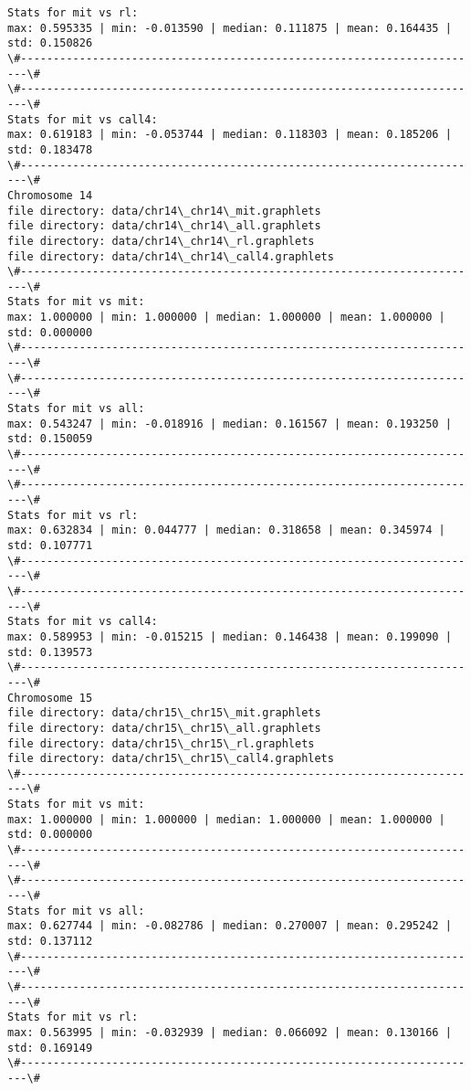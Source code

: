 \documentclass[11pt]{article}
\begin{document}
\begin{Verbatim}[commandchars=\\\{\}]
Stats for mit vs rl: 
max: 0.595335 | min: -0.013590 | median: 0.111875 | mean: 0.164435 | std: 0.150826
\#-----------------------------------------------------------------------\#
\#-----------------------------------------------------------------------\#
Stats for mit vs call4: 
max: 0.619183 | min: -0.053744 | median: 0.118303 | mean: 0.185206 | std: 0.183478
\#-----------------------------------------------------------------------\#
Chromosome 14
file directory: data/chr14\_chr14\_mit.graphlets
file directory: data/chr14\_chr14\_all.graphlets
file directory: data/chr14\_chr14\_rl.graphlets
file directory: data/chr14\_chr14\_call4.graphlets
\#-----------------------------------------------------------------------\#
Stats for mit vs mit: 
max: 1.000000 | min: 1.000000 | median: 1.000000 | mean: 1.000000 | std: 0.000000
\#-----------------------------------------------------------------------\#
\#-----------------------------------------------------------------------\#
Stats for mit vs all: 
max: 0.543247 | min: -0.018916 | median: 0.161567 | mean: 0.193250 | std: 0.150059
\#-----------------------------------------------------------------------\#
\#-----------------------------------------------------------------------\#
Stats for mit vs rl: 
max: 0.632834 | min: 0.044777 | median: 0.318658 | mean: 0.345974 | std: 0.107771
\#-----------------------------------------------------------------------\#
\#-----------------------------------------------------------------------\#
Stats for mit vs call4: 
max: 0.589953 | min: -0.015215 | median: 0.146438 | mean: 0.199090 | std: 0.139573
\#-----------------------------------------------------------------------\#
Chromosome 15
file directory: data/chr15\_chr15\_mit.graphlets
file directory: data/chr15\_chr15\_all.graphlets
file directory: data/chr15\_chr15\_rl.graphlets
file directory: data/chr15\_chr15\_call4.graphlets
\#-----------------------------------------------------------------------\#
Stats for mit vs mit: 
max: 1.000000 | min: 1.000000 | median: 1.000000 | mean: 1.000000 | std: 0.000000
\#-----------------------------------------------------------------------\#
\#-----------------------------------------------------------------------\#
Stats for mit vs all: 
max: 0.627744 | min: -0.082786 | median: 0.270007 | mean: 0.295242 | std: 0.137112
\#-----------------------------------------------------------------------\#
\#-----------------------------------------------------------------------\#
Stats for mit vs rl: 
max: 0.563995 | min: -0.032939 | median: 0.066092 | mean: 0.130166 | std: 0.169149
\#-----------------------------------------------------------------------\#

\end{Verbatim}
\end{document}
